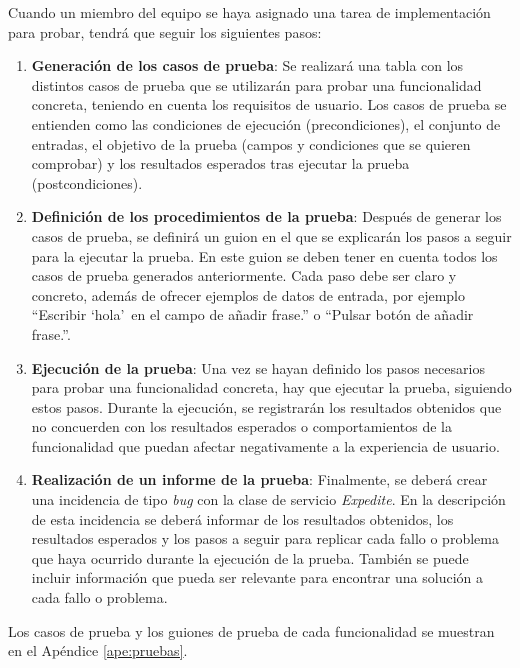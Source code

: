Cuando un miembro del equipo se haya asignado una tarea de implementación para probar, tendrá que seguir los siguientes pasos:
\begin{enumerate}
    \item \textbf{Generación de los casos de prueba}: Se realizará una tabla con los distintos casos de prueba que se utilizarán para probar una funcionalidad concreta, teniendo en cuenta los requisitos de usuario. Los casos de prueba se entienden como las condiciones de ejecución (precondiciones), el conjunto de entradas, el objetivo de la prueba (campos y condiciones que se quieren comprobar) y los resultados esperados tras ejecutar la prueba (postcondiciones).
    \item \textbf{Definición de los procedimientos de la prueba}: Después de generar los casos de prueba, se definirá un guion en el que se explicarán los pasos a seguir para la ejecutar la prueba. En este guion se deben tener en cuenta todos los casos de prueba generados anteriormente. Cada paso debe ser claro y concreto, además de ofrecer ejemplos de datos de entrada, por ejemplo ``Escribir `hola'\, en el campo de añadir frase.'' o ``Pulsar botón de añadir frase.''.
    \item \textbf{Ejecución de la prueba}: Una vez se hayan definido los pasos necesarios para probar una funcionalidad concreta, hay que ejecutar la prueba, siguiendo estos pasos. Durante la ejecución, se registrarán los resultados obtenidos que no concuerden con los resultados esperados o comportamientos de la funcionalidad que puedan afectar negativamente a la experiencia de usuario.
    \item \textbf{Realización de un informe de la prueba}: Finalmente, se deberá crear una incidencia de tipo \textit{bug} con la clase de servicio \textit{Expedite}. En la descripción de esta incidencia se deberá informar de los resultados obtenidos, los resultados esperados y los pasos a seguir para replicar cada fallo o problema que haya ocurrido durante la ejecución de la prueba. También se puede incluir información que pueda ser relevante para encontrar una solución a cada fallo o problema.
\end{enumerate}

Los casos de prueba y los guiones de prueba de cada funcionalidad se muestran en el Apéndice \ref{ape:pruebas}.